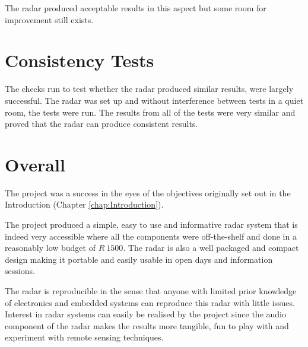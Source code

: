 The radar produced acceptable results in this aspect but some room for improvement still exists.

\section{Consistency Tests}
The checks run to test whether the radar produced similar results, were largely successful. The radar was set up and without interference between tests in a quiet room, the tests were run. The results from all of the tests were very similar and proved that the radar can produce consistent results.

\section{Overall}

The project was a success in the eyes of the objectives originally set out in the Introduction (Chapter \ref{chap:Introduction}). 

The project produced a simple, easy to use and informative radar system that is indeed very accessible where all the components were off-the-shelf and done in a reasonably low budget of $R\ 1500$. The radar is also a well packaged and compact design making it portable and easily usable in open days and information sessions.

The radar is reproducible in the sense that anyone with limited prior knowledge of electronics and embedded systems can reproduce this radar with little issues. Interest in radar systems can easily be realised by the project since the audio component of the radar makes the results more tangible, fun to play with and experiment with remote sensing techniques.



\newpage